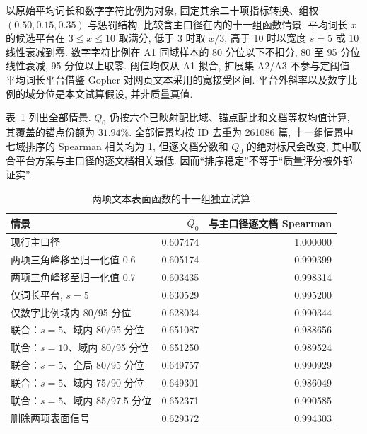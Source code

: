 以原始平均词长和数字字符比例为对象, 固定其余二十项指标转换、组权 $(0.50, 0.15, 0.35)$ 与惩罚结构, 比较含主口径在内的十一组函数情景. 平均词长 $x$ 的候选平台在 $3\le x\le10$ 取满分, 低于 3 时取 $x/3$, 高于 10 时以宽度 $s=5$ 或 10 线性衰减到零. 数字字符比例在 A1 同域样本的 80 分位以下不扣分, 80 至 95 分位线性衰减, 95 分位以上取零. 阈值均仅从 A1 拟合, 扩展集 A2/A3 不参与定阈值. 平均词长平台借鉴 Gopher 对网页文本采用的宽接受区间\cite{gopher}. 平台外斜率以及数字比例的域分位是本文试算假设, 并非质量真值. 

表~\ref{tab:q1-function-sens-v8} 列出全部情景. $Q_0$ 仍按六个已映射配比域、锚点配比和文档等权均值计算, 其覆盖的锚点份额为 $31.94\%$. 全部情景均按 ID 去重为 261086 篇, 十一组情景中七域排序的 Spearman 相关均为 1, 但逐文档分数和 $Q_0$ 的绝对标尺会改变, 其中联合平台方案与主口径的逐文档相关最低. 因而“排序稳定”不等于“质量评分被外部证实”. 
\begin{table}[htbp]\centering\small
\caption{两项文本表面函数的十一组独立试算}\label{tab:q1-function-sens-v8}
\begin{tabular}{lrr}\toprule
情景 & $Q_0$ & 与主口径逐文档 Spearman\\\midrule
现行主口径 & 0.607474 & 1.000000\\
两项三角峰移至归一化值 0.6 & 0.605174 & 0.999399\\
两项三角峰移至归一化值 0.7 & 0.603435 & 0.998314\\
仅词长平台, $s=5$ & 0.630529 & 0.995200\\
仅数字比例域内 80/95 分位 & 0.628034 & 0.990344\\
联合：$s=5$、域内 80/95 分位 & 0.651087 & 0.988656\\
联合：$s=10$、域内 80/95 分位 & 0.651250 & 0.989524\\
联合：$s=5$、全局 80/95 分位 & 0.649757 & 0.990929\\
联合：$s=5$、域内 75/90 分位 & 0.649301 & 0.986049\\
联合：$s=5$、域内 85/97.5 分位 & 0.652371 & 0.990585\\
删除两项表面信号 & 0.629372 & 0.994303\\
\bottomrule\end{tabular}\end{table}

